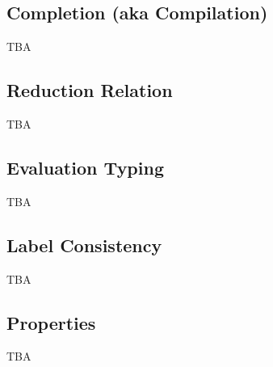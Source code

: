 \documentclass[nonacm,10pt]{acmart}
\begin{document}
\subsection{Completion (aka Compilation)}

TBA


\subsection{Reduction Relation}

TBA

 
\subsection{Evaluation Typing}

TBA


\subsection{Label Consistency}

TBA


\subsection{Properties}

TBA
\end{document}
